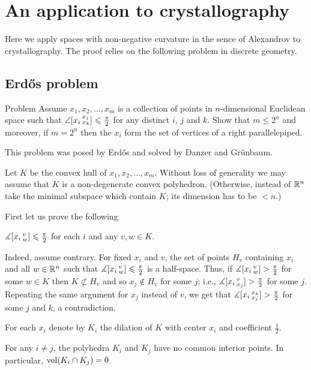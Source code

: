 \chapter{An application to crystallography}\label{chap:erdos}

Here we apply spaces with non-negative curvature in the sence of Alexandrov 
to crystallography.
The proof relies on the following problem in discrete geometry.

\section{Erd\H os problem}

\begin{thm}{Problem}
Assume $x_1,x_2,\dots,x_m$ is a collection of points in $n$-dimensional Euclidean space such that 
$\angle[x_i\,{}^{x_j}_{x_k}]\leqslant \tfrac\pi2$ for any distinct $i$, $j$ and $k$. 
Show that $m\le 2^n$ and moreover, if $m= 2^n$ then the $x_i$ form the set of vertices of a right parallelepiped.
\end{thm}

This problem was posed by Erd\H os and solved by Danzer and Gr\"unbaum.

Let $K$ be the convex hull of $x_1,x_2,\dots,x_m$.
Without loss of generality we may assume that $K$ is a non-degenerate convex polyhedron.
(Otherwise, instead of $\mathbb{R}^n$ take the minimal subspace which contain $K$; its dimension has to be $<n$.)

First let us prove the following

\begin{clm}{}\label{clm:=<pi/2}
$\measuredangle[x_i\,{}^{v}_{w}]\leqslant \tfrac\pi2$ for each $i$ and any $v,w\in K$.
\end{clm}

Indeed, assume contrary.
For fixed $x_i$ and $v$,
the set of points $H_v$ containing $x_i$ and all $w\in\mathbb{R}^n$ such that $\measuredangle[x_i\,{}^{v}_{w}]\leqslant \tfrac\pi2$
is a half-space.
Thus, if $\measuredangle[x_i\,{}^{v}_{w}]>\tfrac\pi2$ for some $w\in K$ then
 $K\not\subset H_v$ and so $x_j \notin H_v$ for some $j$; i.e., $\measuredangle[x_i\,{}^{v}_{x_j}]> \tfrac\pi2$ for some $j$.
Repeating the same argument for $x_j$ instead of $v$, we get that 
$\measuredangle[x_i\,{}^{x_k}_{x_j}]> \tfrac\pi2$ for some $j$ and $k$, a contradiction.

For each $x_i$ denote by $K_i$ the dilation of $K$ with center $x_i$ and coefficient $\tfrac12$.

\begin{clm}{}\label{clm:K_inK_j}
For any $i\ne j$, the polyhedra $K_i$ and $K_j$ have no common interior points.
In particular, $\operatorname{vol} (K_i\cap K_j)=0$.
\end{clm}


